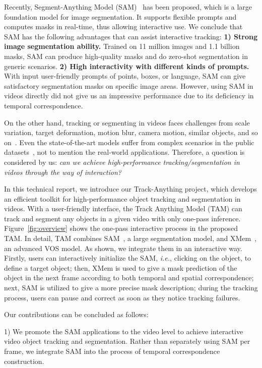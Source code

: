 \documentclass{article}
\begin{document}
Recently, Segment-Anything Model (SAM)~\cite{sam} has been proposed, which is a large foundation model for image segmentation.
It supports flexible prompts and computes masks in real-time, thus allowing interactive use.
We conclude that SAM has the following advantages that can assist interactive tracking:
\textbf{1) Strong image segmentation ability.}
Trained on 11 million images and 1.1 billion masks, SAM can produce high-quality masks and do zero-shot segmentation in generic scenarios.
\textbf{2) High interactivity with different kinds of prompts. }
With input user-friendly prompts of points, boxes, or language, SAM can give satisfactory segmentation masks on specific image areas.
However, using SAM in videos directly did not give us an impressive performance due to its deficiency in temporal correspondence.

On the other hand, tracking or segmenting in videos faces challenges from scale variation, target deformation, motion blur, camera motion, similar objects, and so on~\cite{vos,vot6,vot7,vot8,vot9,vot10}.
Even the state-of-the-art models suffer from complex scenarios in the public datasets~\cite{xmem}, not to mention the real-world applications.
Therefore, a question is considered by us:
\textit{can we achieve high-performance tracking/segmentation in videos through the way of interaction?}

In this technical report, we introduce our Track-Anything project, which develops an efficient toolkit for high-performance object tracking and segmentation in videos.
With a user-friendly interface, the Track Anything Model (TAM) can track and segment any objects in a given video with only one-pass inference.
Figure~\ref{fig:overview} shows the one-pass interactive process in the proposed TAM.
In detail, TAM combines SAM~\cite{sam}, a large segmentation model, and XMem~\cite{xmem}, an advanced VOS model.
As shown, we integrate them in an interactive way.
Firstly, users can interactively initialize the SAM, \textit{i.e.}, clicking on the object, to define a target object;
then, XMem is used to give a mask prediction of the object in the next frame according to both temporal and spatial correspondence;
next, SAM is utilized to give a more precise mask description;
during the tracking process, users can pause and correct as soon as they notice tracking failures.

Our contributions can be concluded as follows:

1) We promote the SAM applications to the video level to achieve interactive video object tracking and segmentation.
Rather than separately using SAM per frame, we integrate SAM into the process of temporal correspondence construction.
\end{document}
